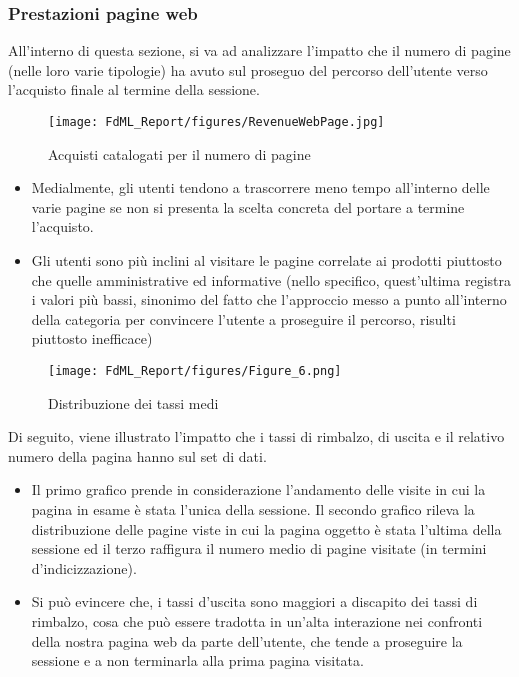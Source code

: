 \documentclass[10pt,a4paper]{article}
\begin{document}
\subsubsection{Prestazioni pagine web}
All'interno di questa sezione, si va ad analizzare l'impatto che il numero di pagine (nelle loro varie tipologie) ha avuto sul proseguo del percorso dell'utente verso l'acquisto finale al termine della sessione.

\begin{figure}[ht]
    \centering\texttt{[image: FdML\_Report/figures/RevenueWebPage.jpg]}
    \caption{Acquisti catalogati per il numero di pagine}
    \label{fig:example}
\end{figure}

\begin{itemize}
    \item Medialmente, gli utenti tendono a trascorrere meno tempo all'interno delle varie pagine se non si presenta la scelta concreta del portare a termine l'acquisto.
\end{itemize} 
\begin{itemize}
    \item Gli utenti sono più inclini al visitare le pagine correlate ai prodotti piuttosto che quelle amministrative ed informative (nello specifico, quest'ultima registra i valori più bassi, sinonimo del fatto che l'approccio messo a punto all'interno della categoria per convincere l'utente a proseguire il percorso, risulti piuttosto inefficace)
\end{itemize}
\clearpage

\begin{wrapfigure}{r}{0.5\textwidth}
  \begin{center}
    \texttt{[image: FdML\_Report/figures/Figure\_6.png]}
  \end{center}
  \caption{Distribuzione dei tassi medi}
\end{wrapfigure}

\hfill \break
Di seguito, viene illustrato l'impatto che i tassi di rimbalzo, di uscita e il relativo numero della pagina hanno sul set di dati.

\begin{itemize}
    \item Il primo grafico prende in considerazione l'andamento delle visite in cui la pagina in esame è stata l’unica della sessione. Il secondo grafico rileva la distribuzione delle pagine viste in cui la pagina oggetto è stata l’ultima della sessione ed il terzo raffigura il numero medio di pagine visitate (in termini d'indicizzazione).
\end{itemize}
\begin{itemize}
    \item Si può evincere che, i tassi d'uscita sono maggiori a discapito dei tassi di rimbalzo, cosa che può essere tradotta in un'alta interazione nei confronti della nostra pagina web da parte dell'utente, che tende a proseguire la sessione e a non terminarla alla prima pagina visitata.
\end{itemize}
\end{document}
